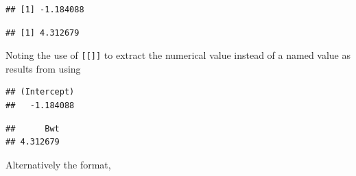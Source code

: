 \documentclass[
]{article}
\newenvironment{Shaded}{\begin{snugshade}}{\end{snugshade}}
\newcommand{\DecValTok}[1]{\textcolor[rgb]{0.00,0.00,0.81}{#1}}
\newcommand{\KeywordTok}[1]{\textcolor[rgb]{0.13,0.29,0.53}{\textbf{#1}}}
\newcommand{\NormalTok}[1]{#1}
\newcommand{\OperatorTok}[1]{\textcolor[rgb]{0.81,0.36,0.00}{\textbf{#1}}}
\newcommand{\StringTok}[1]{\textcolor[rgb]{0.31,0.60,0.02}{#1}}
\begin{document}
\begin{Shaded}
\end{Shaded}

\begin{verbatim}
## [1] -1.184088
\end{verbatim}

\begin{Shaded}
\end{Shaded}

\begin{verbatim}
## [1] 4.312679
\end{verbatim}

Noting the use of \texttt{{[}{[}{]}{]}} to extract the numerical value
instead of a named value as results from using

\begin{Shaded}
\end{Shaded}

\begin{verbatim}
## (Intercept) 
##   -1.184088
\end{verbatim}

\begin{Shaded}
\end{Shaded}

\begin{verbatim}
##      Bwt 
## 4.312679
\end{verbatim}

Alternatively the format,

\begin{Shaded}
\end{Shaded}
\end{document}
